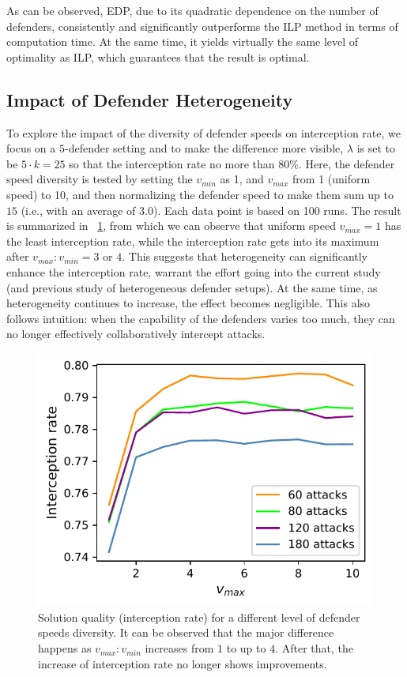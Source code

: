 As can be observed, EDP, due to its quadratic dependence on the number of defenders, consistently and significantly outperforms the ILP method in terms of computation time. At the same time, it yields virtually the same level of optimality as ILP, which guarantees that the result is optimal. 

\subsection{Impact of Defender Heterogeneity}
To explore the impact of the diversity of defender speeds on interception rate, we focus on a $5$-defender setting and to make the difference more visible, 
$\lambda$ is set to be $5\cdot k = 25$ so that the interception rate no more than 80\%. 
Here, the defender speed diversity is tested by setting the $v_{min}$ as 1, and $v_{max}$ from 1 (uniform speed) to 10, 
and then normalizing the defender speed to make them sum up to $15$ (i.e., with an average of $3.0$). 
Each data point is based on 100 runs. The result is summarized in ~\ref{fig:bd-heterogeneity}, 
from which we can observe that uniform speed $v_{max} = 1$ has the least interception rate, 
while the interception rate gets into its maximum after $v_{max}:v_{min} = 3$ or $4$. 
This suggests that heterogeneity can significantly enhance the interception rate, 
warrant the effort going into the current study (and previous study of heterogeneous defender setups). 
At the same time, as heterogeneity continues to increase, the effect becomes negligible. 
This also follows intuition: when the capability of the defenders varies too much, 
they can no longer effectively collaboratively intercept attacks. 

\begin{figure}[h!]
    \centering
    \includegraphics[width=0.5\linewidth]{chapters/bd/fig/heterogeneity.pdf}
    \caption[Solution quality (interception rate) for a different level of defender speeds diversity]{Solution quality (interception rate) for a different level of defender speeds diversity. It can be observed that the major difference happens as $v_{max}:v_{min}$ increases from $1$ to up to $4$. After that, the increase of interception rate no longer shows improvements.}
    \label{fig:bd-heterogeneity}
    \vspace{-2mm}
\end{figure}

